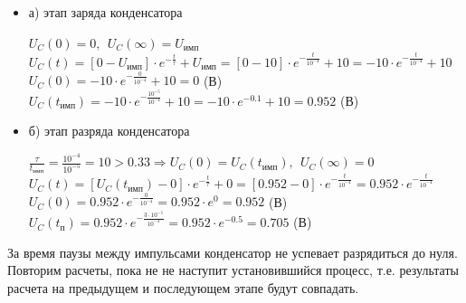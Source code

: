 		
\begin{itemize}
\item[] а) этап заряда конденсатора

		$U_C(0) = 0,\ \ U_C(\infty) = U_\text{имп}$\\	
		$U_C(t) = [0 - U_\text{имп}] \cdot e^{-\frac{t}{\tau}} + U_\text{имп} = [0 - 10] \cdot e^{-\frac{t}{10^{-4}}} + 10 = -10 \cdot e^{-\frac{t}{10^{-4}}} + 10$\\
		$U_C(0) = -10 \cdot e^{-\frac{0}{10^{-4}}} + 10 = 0$ (В)\\
		$U_C(t_\text{имп}) = -10 \cdot e^{-\frac{10^{-5}}{10^{-4}}} + 10 = -10 \cdot e^{-0.1} + 10 = 0.952$ (В)\\
		
\item[] б) этап разряда конденсатора
	
		$\frac{\tau}{t_\text{имп}} = \frac{10^{-4}}{10^{-5}} = 10 > 0.33 \Rightarrow U_C(0) = U_C(t_\text{имп}),\ \ U_C(\infty) = 0$\\
		$U_C(t) = [U_C(t_\text{имп}) - 0] \cdot e^{-\frac{t}{\tau}} + 0 =  [0.952 - 0] \cdot e^{-\frac{t}{10^{-4}}} = 0.952 \cdot e^{-\frac{t}{10^{-4}}}$\\
		$U_C(0) = 0.952 \cdot e^{-\frac{0}{10^{-4}}} = 0.952 \cdot e^0 = 0.952$ (В)\\
		$U_C(t_\text{п}) = 0.952 \cdot e^{-\frac{3 \cdot 10^{-5}}{10^{-4}}} = 0.952 \cdot e^{-0.5} = 0.705$ (В)\\
		
\end{itemize}				
		
За время паузы между импульсами конденсатор не успевает разрядиться до нуля. Повторим расчеты, пока не не наступит установившийся процесс, т.е. результаты расчета на предыдущем и последующем этапе будут совпадать.	
	

